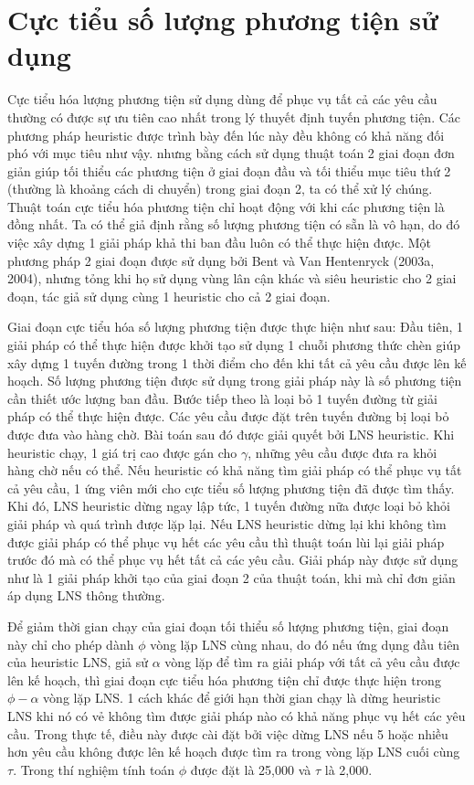 \section{Cực tiểu số lượng phương tiện sử dụng}
Cực tiểu hóa lượng phương tiện sử dụng dùng để phục vụ tất cả các yêu cầu thường có được sự ưu tiên cao nhất trong lý thuyết định tuyến phương tiện. Các phương pháp heuristic được trình bày đến lúc này đều không có khả năng đối phó với mục tiêu như vậy. nhưng bằng cách sử dụng thuật toán 2 giai đoạn đơn giản giúp tối thiểu các phương tiện ở giai đoạn đầu và tối thiểu mục tiêu thứ 2 (thường là khoảng cách di chuyển) trong giai đoạn 2, ta có thể xử lý chúng. Thuật toán cực tiểu hóa phương tiện chỉ hoạt động với khi các phương tiện là đồng nhất. Ta có thể giả định rằng số lượng phương tiện có sẵn là vô hạn, do đó việc xây dựng 1 giải pháp khả thi ban đầu luôn có thể thực hiện được. Một phương pháp 2 giai đoạn được sử dụng bởi Bent và Van Hentenryck (2003a, 2004), nhưng tỏng khi họ sử dụng vùng lân cận khác và siêu heuristic cho 2 giai đoạn, tác giả sử dụng cùng 1 heuristic cho cả 2 giai đoạn.

Giai đoạn cực tiểu hóa số lượng phương tiện được thực hiện như sau: Đầu tiên, 1 giải pháp có thể thực hiện được khởi tạo sử dụng 1 chuỗi phương thức chèn giúp xây dựng 1 tuyến đường trong 1 thời điểm cho đến khi tất cả yêu cầu được lên kế hoạch. Số lượng phương tiện được sử dụng trong giải pháp này là số  phương tiện cần thiết ước lượng ban đầu. Bước tiếp theo là loại bỏ 1 tuyến đường từ giải pháp có thể thực hiện được. Các yêu cầu được đặt trên tuyến đường bị loại bỏ được đưa vào hàng chờ. Bài toán sau đó được giải quyết bởi LNS heuristic. Khi heuristic chạy, 1 giá trị cao được gán cho $\gamma$, những yêu cầu được đưa ra khỏi hàng chờ nếu có thể. Nếu heuristic có khả năng tìm giải pháp có thể phục vụ tất cả yêu cầu, 1 ứng viên mới cho cực tiểu số lượng phương tiện đã được tìm thấy. Khi đó, LNS heuristic dừng ngay lập tức, 1 tuyến đường nữa được loại bỏ khỏi giải pháp và quá trình được lặp lại. Nếu LNS heuristic dừng lại khi không tìm được giải pháp có thể phục vụ hết các yêu cầu thì thuật toán lùi lại giải pháp trước đó mà có thể phục vụ hết tất cả các yêu cầu. Giải pháp này được sử dụng như là 1 giải pháp khởi tạo của giai đoạn 2 của thuật toán, khi mà chỉ đơn giản áp dụng LNS thông thường.

Để giảm thời gian chạy của giai đoạn tối thiểu số lượng phương tiện, giai đoạn này chỉ cho phép dành $\phi$ vòng lặp LNS cùng nhau, do đó nếu ứng dụng đầu tiên của heuristic LNS, giả sử $\alpha$ vòng lặp để tìm ra giải pháp với tất cả yêu cầu được lên kế hoạch, thì giai đoạn cực tiểu hóa phương tiện chỉ được thực hiện trong $\phi - \alpha$ vòng lặp LNS. 1 cách khác để giới hạn thời gian chạy là dừng heuristic LNS khi nó có vẻ không tìm được giải pháp nào có khả năng phục vụ hết các yêu cầu. Trong thực tế, điều này được cài đặt bởi việc dừng LNS nếu 5 hoặc nhiều hơn yêu cầu không được lên kế hoạch được tìm ra trong vòng lặp LNS cuối cùng $\tau$. Trong thí nghiệm tính toán $\phi$ được đặt là 25,000 và $\tau$ là 2,000.
